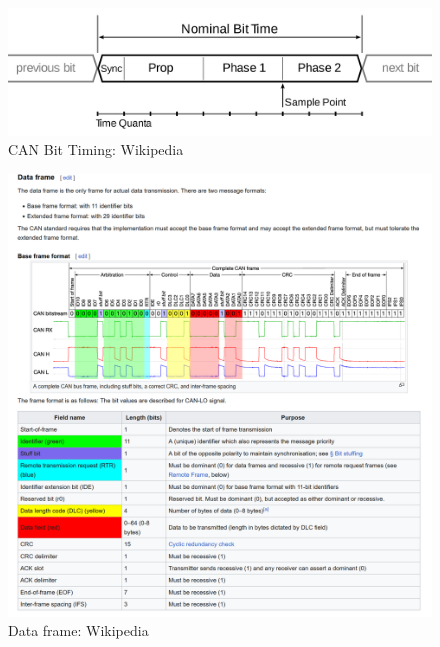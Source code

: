 \begin{figure}
    \centering
    \includegraphics[width=1\linewidth]{2880px-CAN_Bit_Timing2.svg.png}
    \caption{CAN Bit Timing: Wikipedia}
    \label{fig:enter-label}
\end{figure}
\begin{figure}
      \centering
      \includegraphics[width=1\linewidth]{Dataframe.png}
      \caption{Data frame: Wikipedia}
      \label{fig:enter-label}
  \end{figure}



